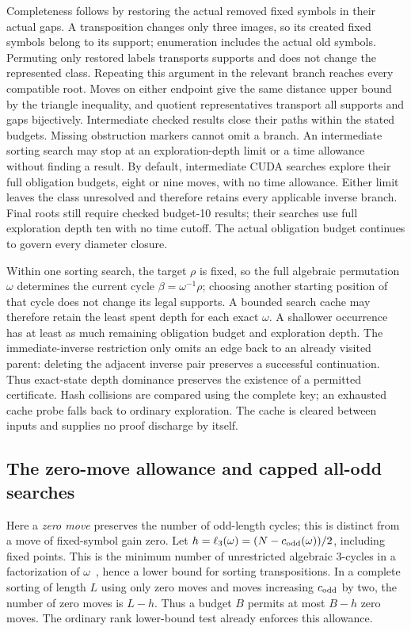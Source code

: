 \documentclass[11pt,a4paper]{article}
\begin{document}
Completeness follows by restoring the actual removed fixed symbols in their
actual gaps. A transposition changes only three images, so its created fixed
symbols belong to its support; enumeration includes the actual old symbols.
Permuting only restored labels transports supports and does not change the
represented class. Repeating this argument in the relevant branch reaches
every compatible root. Moves on either endpoint give the same distance upper
bound by the triangle inequality, and quotient representatives transport all
supports and gaps bijectively. Intermediate checked results close their paths
within the stated budgets. Missing obstruction markers cannot omit a branch.
An intermediate sorting search may stop at an exploration-depth limit or a
time allowance without finding a result. By default, intermediate CUDA searches
explore their full obligation budgets, eight or nine moves, with no time
allowance. Either limit leaves the class
unresolved and therefore retains every
applicable inverse branch. Final roots still require checked budget-10 results;
their searches use full exploration depth ten with no time cutoff. The actual obligation budget continues to
govern every diameter closure.

Within one sorting search, the target $\rho$ is fixed, so the full algebraic
permutation $\omega$ determines the current cycle
$\beta=\omega^{-1}\rho$; choosing another starting position of that cycle
does not change its legal supports. A bounded search cache may therefore
retain the least spent depth for each exact $\omega$. A shallower occurrence
has at least as much remaining obligation budget and exploration depth.
The immediate-inverse restriction only omits an edge back to an already visited
parent: deleting the adjacent inverse pair preserves a successful continuation.
Thus exact-state depth dominance preserves the existence of a permitted
certificate. Hash collisions are compared using the complete key; an exhausted
cache probe falls back to ordinary exploration. The cache is cleared between
inputs and supplies no proof discharge by itself.

\subsection{The zero-move allowance and capped all-odd searches}
Here a \emph{zero move} preserves the number of odd-length cycles; this is
distinct from a move of fixed-symbol gain zero. Let
$h=\ell_3(\omega)=(N-c_{\rm odd}(\omega))/2$, including fixed points.
This is the minimum number of unrestricted algebraic $3$-cycles in a
factorization of $\omega$~\cite[Proposition 3.1]{muhle-nadeau}, hence a
lower bound for sorting transpositions. In a complete sorting of length $L$
using only zero moves and moves increasing $c_{\rm odd}$ by two, the number
of zero moves is $L-h$. Thus a budget $B$ permits at most $B-h$ zero moves.
The ordinary rank lower-bound test already enforces this allowance.
\end{document}
